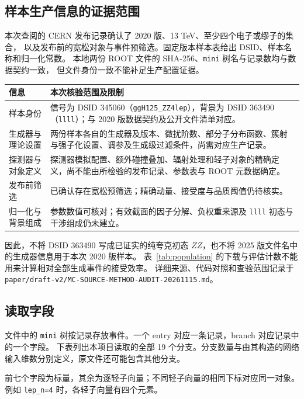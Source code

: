 \documentclass[11pt,a4paper,fontset=fandol,scheme=plain]{ctexart}
\begin{document}
\subsection{样本生产信息的证据范围}
本次查阅的 CERN 发布记录\cite{OpenData}确认了 2020 版、13 TeV、至少四个电子或缪子的集合，
以及发布前的宽松对象与事件预筛选。固定版本样本表\cite{SampleInfo}给出 DSID、样本名称和归一化常数。
本地两份 ROOT 文件的 SHA-256、\texttt{mini} 树名与记录数均与数据契约一致，
但文件身份一致不能补足生产配置证据。

\begin{center}
\small
\begin{tabularx}{\linewidth}{@{}p{.23\linewidth}Y@{}}
\toprule
信息 & 本次核验范围及限制 \\
\midrule
样本身份 & 信号为 DSID 345060（\texttt{ggH125\_ZZ4lep}），背景为 DSID 363490（\texttt{llll}）；与 2020 版数据契约及公开文件清单对应。 \\
生成器与理论设置 & 两份样本各自的生成器及版本、微扰阶数、部分子分布函数、簇射与强子化设置、调参及生成级过滤条件，尚需对应生产记录。 \\
探测器与对象定义 & 探测器模拟配置、额外碰撞叠加、辐射处理和轻子对象的精确定义，尚不能由所检验的发布记录、参数表与 ROOT 元数据确定。 \\
发布前筛选 & 已确认存在宽松预筛选；精确动量、接受度与品质阈值仍待核实。 \\
归一化与背景组成 & 参数数值可核对；有效截面的因子分解、负权重来源及 \texttt{llll} 初态与干涉组成仍未建立。 \\
\bottomrule
\end{tabularx}
\end{center}
因此，不将 DSID 363490 写成已证实的纯夸克初态 $ZZ$，也不将 2025 版文件名中的生成器信息用于本次 2020 版样本。
表~\ref{tab:population} 的下载与评估计数不能用来计算相对全部生成事件的接受效率。
详细来源、代码对照和查验范围记录于 \nolinkurl{paper/draft-v2/MC-SOURCE-METHOD-AUDIT-20261115.md}。
\subsection{读取字段}
文件中的 \texttt{mini} 树按记录存放事件。一个 entry 对应一条记录，branch 对应记录中的一个字段。
下表列出本项目读取的全部 19 个分支。分支数量与由其构造的网络输入维数分别定义，原文件还可能包含其他分支。

前七个字段为标量，其余为逐轻子向量；不同轻子向量的相同下标对应同一对象。
例如 \texttt{lep\_n=4} 时，各轻子向量有四个元素。
\end{document}
